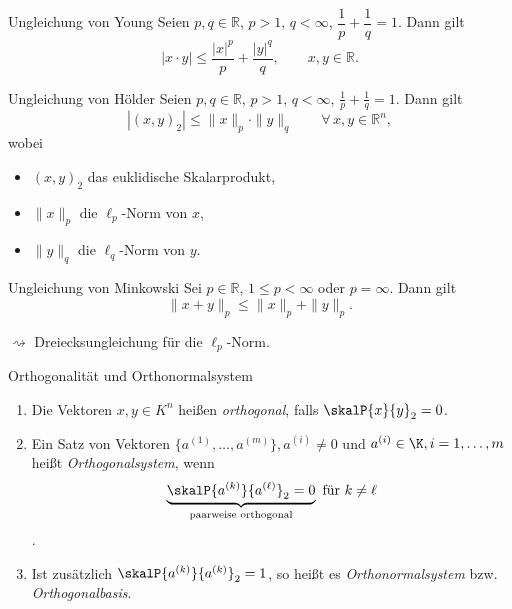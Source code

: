 \begin{lemma}{Ungleichung von Young}
    Seien $p,q\in\mathbb{R}$, $p>1$, $q<\infty$, $\dfrac{1}{p}+\dfrac{1}{q}=1$. Dann gilt
    $$
    \lvert x\cdot y\rvert \leq \frac{\lvert x\rvert^{p}}{p} + \frac{\lvert y\rvert^{q}}{q},\qquad x,y\in\mathbb{R}.
    $$
\end{lemma}

\begin{lemma}{Ungleichung von Hölder}
    Seien $p,q\in\mathbb{R}$, $p>1$, $q<\infty$, $\displaystyle\frac{1}{p}+\frac{1}{q}=1$. Dann gilt
    $$
    \left|(x,y)_2\right| \le \|x\|_p\cdot\|y\|_q \qquad \forall\, x,y\in\mathbb{R}^n,
    $$
    wobei
    \begin{itemize}
        \item $(x,y)_2$ das euklidische Skalarprodukt,
        \item $\|x\|_p$ die $\ell_p$-Norm von $x$,
        \item $\|y\|_q$ die $\ell_q$-Norm von $y$.
    \end{itemize}
\end{lemma}

\begin{lemma}{Ungleichung von Minkowski}
    Sei $p\in\mathbb{R}$, $1\le p<\infty$ oder $p=\infty$. Dann gilt
    $$
    \|x+y\|_p \le \|x\|_p + \|y\|_p.
    $$

    $\rightsquigarrow$ Dreiecksungleichung für die $\ell_p$-Norm.
\end{lemma}

\begin{definition}{Orthogonalität und Orthonormalsystem}
    \begin{enumerate}
        \item Die Vektoren $x,y\in K^n$ heißen \emph{orthogonal}, falls $\skalP{x}{y}_2 = 0$.
        \item Ein Satz von Vektoren $\{a^{(1)},\dots,a^{(m)}\}, a^{(i)} \not= 0$ und $a^{(i)} \in \K, i = 1,\dots,m$ heißt \emph{Orthogonalsystem}, wenn 
        $$
        \underbrace{\skalP{a^{(k)}}{a^{(\ell)}}_2 = 0}_{\text{paarweise orthogonal}} \text{ für } k\ne\ell
        $$.
        \item Ist zusätzlich $\skalP{a^{(k)}}{a^{(k)}}_2 = 1$, so heißt es \emph{Orthonormalsystem} bzw. \emph{Orthogonalbasis}.
    \end{enumerate}
\end{definition}


